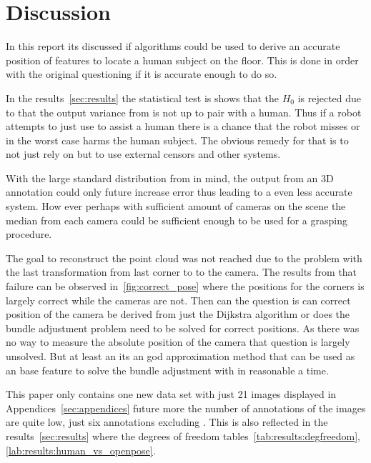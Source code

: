 \section{Discussion}
\label{sec:discussion}
In this report its discussed if \openpose{ } algorithms could be used to derive an accurate position of features to locate a human subject on the floor.
This is done in order with the original questioning if it is accurate enough to do so.


\par In the results~\ref{sec:results} the statistical test is shows that the $H_0$ is rejected due to that the output variance from \openpose{ } is not up to pair with a human.
Thus if a robot attempts to just use \openpose{ } to assist a human there is a chance that the robot misses or in the worst case harms the human subject.
The obvious remedy for that is to not just rely on \openpose{ } but to use external censors and other systems.


\par With the large standard distribution from \openpose{ } in mind, the output from an 3D annotation could only future increase error thus leading to a even less accurate system.
How ever perhaps with sufficient amount of cameras on the scene the median from each camera could be sufficient enough to be used for a grasping procedure.


\par The goal to reconstruct the point cloud was not reached due to the problem with the last transformation from last corner to to the camera.
The results from that failure can be observed in~\ref{fig:correct_pose} where the positions for the \aruco{ } corners is largely correct while the cameras are not.
Then can the question is can correct position of the camera be derived from just the Dijkstra algorithm or does the bundle adjustment problem need to be solved for correct positions.
As there was no way to measure the absolute position of the camera that question is largely unsolved.
But at least an its an god approximation method that can be used as an base feature to solve the bundle adjustment with in reasonable a time.


\par This paper only contains one new data set with just 21 images displayed in Appendices~\ref{sec:appendices} future more the number of annotations of the images are quite low, just six annotations excluding \openpose{ }.
This is also reflected in the results~\ref{sec:results} where the degrees of freedom tables~\ref{tab:results:degfreedom},\ref{lab:results:human_vs_openpose}.


